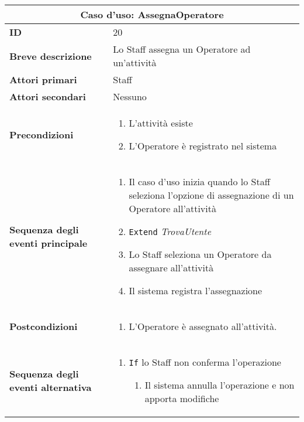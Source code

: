 \documentclass[a4paper]{report}
\begin{document}
\clearpage
\begin{table}[H]
\vspace*{-0cm}
\renewcommand{\arraystretch}{1.9}
\begin{tabular}{|p{3.9cm}|p{9.9cm}|}
\hline
\multicolumn{2}{|c|}{\textbf{Caso d’uso: AssegnaOperatore}} \\ \hline
	\textbf{ID} & 20 \\ \hline
	\textbf{Breve descrizione} & Lo Staff assegna un Operatore ad un’attività \\ \hline
	\textbf{Attori primari} & Staff \\ \hline
	\textbf{Attori secondari} & Nessuno \\ \hline
	\textbf{Precondizioni} & \begin{enumerate}[leftmargin=14pt,label=\arabic*.,labelsep=0.5em,topsep=0pt,partopsep=0pt,parsep=0pt,itemsep=0pt]
    \item L’attività esiste
    \item L’Operatore è registrato nel sistema
\end{enumerate} \\ \hline
	\textbf{Sequenza degli eventi principale} & \begin{enumerate}[leftmargin=14pt,label=\arabic*.,labelsep=0.5em,topsep=0pt,partopsep=0pt,parsep=0pt,itemsep=0pt]
    \item Il caso d'uso inizia quando lo Staff seleziona l'opzione di assegnazione di un Operatore all'attività
    \item \texttt{Extend} \textit{TrovaUtente}
    \item Lo Staff seleziona un Operatore da assegnare all'attività
    \item Il sistema registra l’assegnazione
\end{enumerate} \\ \hline
	\textbf{Postcondizioni} & \begin{enumerate}[label=\arabic*.,leftmargin=14pt,labelsep=0.5em,topsep=0pt,partopsep=0pt,parsep=0pt,itemsep=0pt]
        \item L’Operatore è assegnato all’attività.
    \end{enumerate} \\ \hline
	\textbf{Sequenza degli eventi alternativa} & \begin{enumerate}[leftmargin=14pt,label=\arabic*.,labelsep=0.5em,topsep=0pt,partopsep=0pt,parsep=0pt,itemsep=0pt]
    \item \texttt{If} lo Staff non conferma l’operazione
    \begin{enumerate}[label=\arabic{enumi}.\arabic*.,leftmargin=22pt,labelsep=0.5em,topsep=0pt,partopsep=0pt,parsep=0pt,itemsep=0pt]
        \item Il sistema annulla l’operazione e non apporta modifiche
    \end{enumerate}
\end{enumerate} \\ \hline
\end{tabular}
\end{table}
\end{document}
